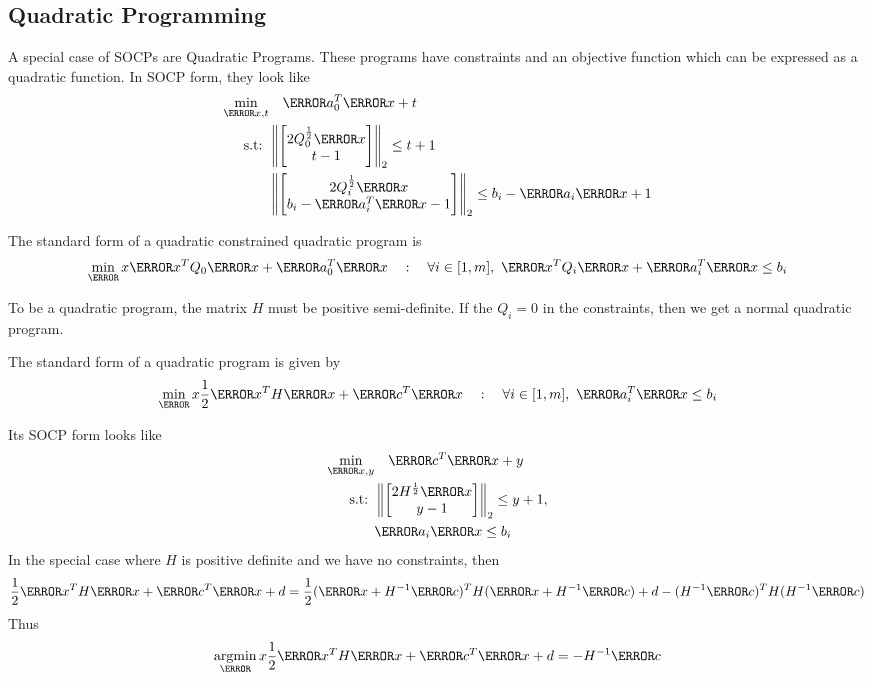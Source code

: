 \subsection{Quadratic Programming}
A special case of SOCPs are Quadratic Programs.
These programs have constraints and an objective function which can be expressed as a quadratic function.
In SOCP form, they look like
\begin{align*}
	\min_{\V{x}, t} &\quad \V{a}_0^T\V{x} + t\\
	\text{s.t: } & \left\lVert \begin{bmatrix}2Q_0^{\frac{1}{2}}\V{x}\\ t-1 \end{bmatrix}\right\rVert_2 \leq t+1\\
	& \left\lVert \begin{bmatrix}2Q_i^{\frac{1}{2}}\V{x}\\ b_i-\V{a}_i^T\V{x}-1 \end{bmatrix}\right\rVert_2 \leq b_i - \V{a}_i\V{x} + 1
\end{align*}
\begin{definition}
	The standard form of a quadratic constrained quadratic program is
	\[
		\min_\V{x} \V{x}^TQ_0\V{x} + \V{a}_0^T\V{x} \quad : \quad \forall i\in[1,m],\ \V{x}^TQ_i\V{x} + \V{a}_i^T\V{x} \leq b_i
	\]
	\label{defn:qcqp}
\end{definition}
To be a quadratic program, the matrix $H$ must be positive semi-definite.
If the $Q_i=0$ in the constraints, then we get a normal quadratic program.
\begin{definition}
	The standard form of a quadratic program is given by \[
		\min_\V{x}\frac{1}{2}\V{x}^TH\V{x} + \V{c}^T\V{x} \quad : \quad \forall i\in[1,m],\ \V{a}_i^T\V{x} \leq b_i
	\]
	\label{defn:quadratic-program}
\end{definition}
Its SOCP form looks like
\begin{align*}
	\min_{\V{x}, y} &\quad \V{c}^T\V{x} + y\\
	\text{s.t: } &\left\lVert \begin{bmatrix}2H^{\frac{1}{2}}\V{x} \\ y - 1 \end{bmatrix}\right\rVert_2 \leq y + 1,\\
	& \V{a}_i\V{x} \leq b_i
\end{align*}
In the special case where $H$ is positive definite and we have no constraints, then
\[
	\frac{1}{2}\V{x}^TH\V{x} + \V{c}^T\V{x} + d = \frac{1}{2}(\V{x} + H^{-1}\V{c})^TH(\V{x} + H^{-1}\V{c}) + d - (H^{-1}\V{c})^TH(H^{-1}\V{c})
\]
Thus \[
	\argmin_\V{x} \frac{1}{2}\V{x}^TH\V{x} + \V{c}^T\V{x} + d = -H^{-1}\V{c}
\]
